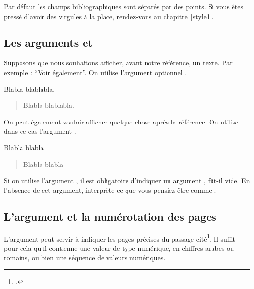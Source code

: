 \begin{plusloins}
Par défaut les champs bibliographiques sont séparés par des points. Si vous êtes pressé d'avoir des virgules à la place, rendez-vous au chapitre~\ref{style1}.
\end{plusloins}

\subsection{Les arguments  et }

Supposons que nous souhaitons afficher, avant notre référence, un texte. Par exemple : \enquote{Voir également}. On utilise l'argument optionnel .

\begin{latexcode}
Blabla \autocite[Voir également][]{Saxer1980} blablabla.
\end{latexcode}

\begin{quotation}
Blabla \cite[Voir également][]{Saxer1980} blablabla.
\end{quotation}



On peut également vouloir afficher quelque chose après la référence. On utilise dans ce cas l'argument .

\begin{latexcode}
Blabla \autocite[Voir également][qui porte sur un
sujet similaire.]{Saxer1980} blabla
\end{latexcode}

\begin{quotation}
Blabla \cite[Voir également][qui porte sur un sujet similaire.]{Saxer1980} blabla
\end{quotation}

\begin{attention}
Si on utilise l'argument , il est obligatoire d'indiquer un argument , fût-il vide. En l'absence de cet argument,  interprète  ce que vous pensiez être  comme .
\end{attention}

\subsection{L'argument  et la numérotation des pages}\label{pagespostnote}

L'argument  peut servir à indiquer les pages précises du passage cité\footcite[On consultera pour plus de détails : ][]{biblatex_pages}. Il suffit pour cela qu'il contienne une valeur de type numérique, en chiffres arabes ou romains, ou bien une séquence de valeurs numériques.

